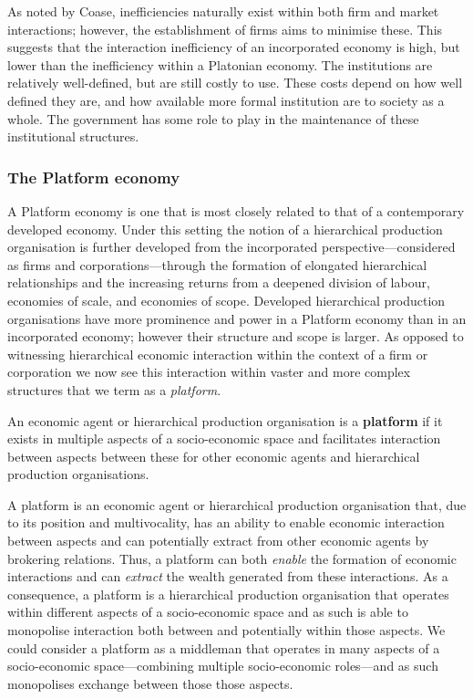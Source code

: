 As noted by Coase, inefficiencies naturally exist within both firm and market interactions; however, the establishment of firms aims to minimise these. This suggests that the interaction inefficiency of an incorporated economy is high, but lower than the inefficiency within a Platonian economy. The institutions are relatively well-defined, but are still costly to use. These costs depend on how well defined they are, and how available more formal institution are to society as a whole. The government has some role to play in the maintenance of these institutional structures.

\subsubsection{The Platform economy}

A Platform economy is one that is most closely related to that of a contemporary developed economy. Under this setting the notion of a hierarchical production organisation is further developed from the incorporated perspective---considered as firms and corporations---through the formation of elongated hierarchical relationships and the increasing returns from a deepened division of labour, economies of scale, and economies of scope. Developed hierarchical production organisations have more prominence and power in a Platform economy than in an incorporated economy; however their structure and scope is larger. As opposed to witnessing hierarchical economic interaction within the context of a firm or corporation we now see this interaction within vaster and more complex structures that we term as a \emph{platform}.
\begin{definition}[Platform] \label{def:platform}
An economic agent or hierarchical production organisation is a \textbf{platform} if it exists in multiple aspects of a socio-economic space and facilitates interaction between aspects between these for other economic agents and hierarchical production organisations.
\end{definition}
A platform is an economic agent or hierarchical production organisation that, due to its position and multivocality, has an ability to enable economic interaction between aspects and can potentially extract from other economic agents by brokering relations. Thus, a platform can both \emph{enable} the formation of economic interactions and can \emph{extract} the wealth generated from these interactions. As a consequence, a platform is a hierarchical production organisation that operates within different aspects of a socio-economic space and as such is able to monopolise interaction both between and potentially within those aspects. We could consider a platform as a middleman that operates in many aspects of a socio-economic space---combining multiple socio-economic roles---and as such monopolises exchange between those those aspects.

